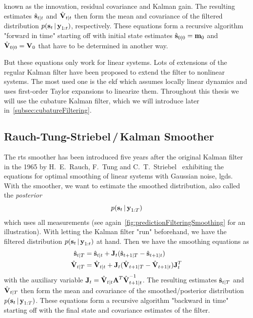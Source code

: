		known as the innovation, residual covariance and Kalman gain. The resulting estimates \( \hat{\boldsymbol{\mathrm{s}}}_{t \vert t} \) and \( \hat{\boldsymbol{\mathrm{V}}}_{t \vert t} \) then form the mean and covariance of the filtered distribution \( p(\boldsymbol{\mathrm{s}}_t \,\vert\, \boldsymbol{\mathrm{y}}_{1:t}) \), respectively. These equations form a recursive algorithm "forward in time" starting off with initial state estimates \( \hat{\boldsymbol{\mathrm{s}}}_{0 \vert 0} = \boldsymbol{\mathrm{m}}_0 \) and \( \hat{\boldsymbol{\mathrm{V}}}_{0 \vert 0} = \boldsymbol{\mathrm{V}}_0 \) that have to be determined in another way.

		But these equations only work for linear systems. Lots of extensions of the regular Kalman filter have been proposed to extend the filter to nonlinear systems. The most used one is the \ac{ekf} which assumes locally linear dynamics and uses first-order Taylor expansions to linearize them. Throughout this thesis we will use the cubature Kalman filter, which we will introduce later in~\autoref{subsec:cubatureFiltering}.

	\subsection{Rauch-Tung-Striebel\,/\,Kalman Smoother}
		The \ac{rts} smoother has been introduced five years after the original Kalman filter in the 1965 by H.~E.~Rauch, F.~Tung and C.~T.~Striebel~\cite{rauchMaximumLikelihoodEstimates1965} exhibiting the equations for optimal smoothing of linear systems with Gaussian noise, \ie \ac{lgds}. With the smoother, we want to estimate the smoothed distribution, also called the \emph{posterior}
		\begin{equation*}
			p(\boldsymbol{\mathrm{s}}_t \,\vert\, \boldsymbol{\mathrm{y}}_{1:T})
		\end{equation*}
		which uses all measurements (see again~\autoref{fig:predictionFilteringSmoothing} for an illustration). With letting the Kalman filter "run" beforehand, we have the filtered distribution \( p(\boldsymbol{\mathrm{s}}_t \,\vert\, \boldsymbol{\mathrm{y}}_{1:t}) \) at hand. Then we have the smoothing equations as
		\begin{align}
			\hat{\boldsymbol{\mathrm{s}}}_{t \vert T} &= \hat{\boldsymbol{\mathrm{s}}}_{t \vert t} + \boldsymbol{\mathrm{J}}_t (\hat{\boldsymbol{\mathrm{s}}}_{t + 1 \vert T} - \hat{\boldsymbol{\mathrm{s}}}_{t + 1 \vert t})  \label{eqn:rtsState} \\
			\hat{\boldsymbol{\mathrm{V}}}_{t \vert T} &= \hat{\boldsymbol{\mathrm{V}}}_{t \vert t} + \boldsymbol{\mathrm{J}}_t (\hat{\boldsymbol{\mathrm{V}}}_{t + 1 \vert T} - \hat{\boldsymbol{\mathrm{V}}}_{t + 1 \vert t}) \boldsymbol{\mathrm{J}}_t^T  \label{eqn:rtsCov}
		\end{align}
		with the auxiliary variable \( \boldsymbol{\mathrm{J}}_t = \hat{\boldsymbol{\mathrm{V}}}_{t \vert t} \boldsymbol{\mathrm{A}}^T \hat{\boldsymbol{\mathrm{V}}}_{t + 1 \vert t}^{-1} \). The resulting estimates \( \hat{\boldsymbol{\mathrm{s}}}_{t \vert T} \) and \( \hat{\boldsymbol{\mathrm{V}}}_{t \vert T} \) then form the mean and covariance of the smoothed/posterior distribution \( p(\boldsymbol{\mathrm{s}}_t \,\vert\, \boldsymbol{\mathrm{y}}_{1:T}) \). These equations form a recursive algorithm "backward in time" starting off with the final state and covariance estimates of the filter.

